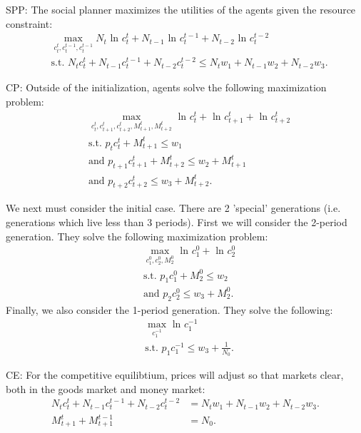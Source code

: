 \documentclass[11pt]{article} %
\begin{document}
SPP: The social planner maximizes the utilities of the agents given the resource constraint: 
\begin{align*}
&\max_{c_t^{t},c_{t}^{t-1},c_{t}^{t-1}} N_{t}\text{ ln } c_{t}^{t} + N_{t-1}\text{ ln } c_{t}^{t-1} + N_{t-2}\text{ ln } c_{t}^{t-2}\\
&\text{s.t. }  N_{t}c_{t}^{t} +  N_{t-1}c_{t}^{t-1} + N_{t-2}c_{t}^{t-2}\leq N_{t}w_1 + N_{t-1}w_2 + N_{t-2}w_3.
\end{align*}


CP: Outside of the initialization, agents solve the following maximization problem:
\begin{align*}
&\max_{c_t^{t},c_{t+1}^{t},c_{t+2}^{t},M_{t+1}^{t},M_{t+2}^{t}} \text{ ln } c_{t}^{t} + \text{ ln } c_{t+1}^{t}+ \text{ ln } c_{t+2}^{t}\\
&\text{s.t. }  p_t c_{t}^{t} + M_{t+1}^t \leq w_1 \\
& \text{and } p_{t+1} c_{t+1}^t  + M_{t+2}^t \leq  w_2 + M_{t+1}^t \\
& \text{and } p_{t+2} c_{t+2}^t \leq w_3 + M_{t+2}^t.
\end{align*}

We next must consider the initial case. There are 2 'special' generations (i.e. generations which live less than 3 periods). First we will consider the 2-period generation. They solve the following maximization problem:
\begin{align*}
&\max_{c_{1}^{0},c_{2}^{0},M_{2}^{0}}  \text{ ln } c_{1}^{0}+ \text{ ln } c_{2}^{0}\\
& \text{s.t. } p_{1} c_{1}^0  + M_{2}^0 \leq  w_2 \\
& \text{and } p_{2} c_{2}^0 \leq w_3 + M_{2}^0.
\end{align*}
Finally, we also consider the 1-period generation. They solve the following:
\begin{align*}
&\max_{c_{1}^{-1}}  \text{ ln } c_{1}^{-1}\\
& \text{s.t. } p_{1} c_{1}^{-1} \leq w_3 + \frac{1}{N_0}.
\end{align*}

CE: For the competitive equilibtium, prices will adjust so that markets clear, both in the goods market and money market:
\begin{align*}
N_{t}c_{t}^{t} +  N_{t-1}c_{t}^{t-1} + N_{t-2}c_{t}^{t-2} &= N_{t}w_1 + N_{t-1}w_2 + N_{t-2}w_3.\\
M_{t+1}^{t} + M_{t+1}^{t-1} &= N_0.
\end{align*}
\end{document}
